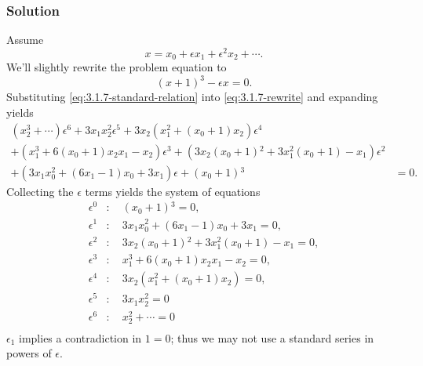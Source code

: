 \documentclass[12pt]{article}
\begin{document}
\subsubsection*{Solution}
Assume
\begin{equation}
  \label{eq:3.1.7-standard-relation}
  x=x_0+\epsilon x_1 + \epsilon^2x_2+\cdots.
\end{equation}
We'll slightly rewrite the problem equation to
\begin{equation}
  \label{eq:3.1.7-rewrite}
  {(x+1)}^3-\epsilon x=0.
\end{equation}
Substituting \cref{eq:3.1.7-standard-relation} into \cref{eq:3.1.7-rewrite} and expanding
yields
\begin{equation*}
  \label{eq:3.1.7-bad-eq}
  \begin{split}
    (x_2^3+\cdots) \epsilon ^6+3 x_1 x_2^2 \epsilon ^5+3 x_2 \left(x_1^2+\left(x_0+1\right)
      x_2\right) \epsilon ^4 \\
    +\left(x_1^3+6 \left(x_0+1\right) x_2 x_1-x_2\right) \epsilon ^3
    +\left(3 x_2 \left(x_0+1\right){}^2+3 x_1^2 \left(x_0+1\right)-x_1\right)
    \epsilon ^2 \\
    +\left(3 x_1 x_0^2+\left(6 x_1-1\right) x_0+3 x_1\right)
    \epsilon +\left(x_0+1\right){}^3&=0.
  \end{split}
\end{equation*}
Collecting the $\epsilon$ terms yields the system of equations
\begin{align*}
  \label{eq:3.1.7-bad-system}
  \epsilon^0 &:\quad \left(x_0+1\right){}^3=0, \\
  \epsilon^1 &:\quad 3 x_1 x_0^2+\left(6 x_1-1\right) x_0+3 x_1=0, \\
  \epsilon^2 &:\quad 3 x_2 \left(x_0+1\right){}^2+3 x_1^2 \left(x_0+1\right)-x_1=0, \\
  \epsilon^3 &:\quad x_1^3+6 \left(x_0+1\right) x_2 x_1-x_2=0, \\
  \epsilon^4 &:\quad 3 x_2 \left(x_1^2+\left(x_0+1\right) x_2\right)=0, \\
  \epsilon^5 &:\quad 3 x_1 x_2^2=0 \\
  \epsilon^6 &:\quad x_2^2+\cdots = 0 \\
\end{align*}
$\epsilon_1$ implies a contradiction in $1=0$; thus we may not use a standard
series in powers of $\epsilon$.
\end{document}
